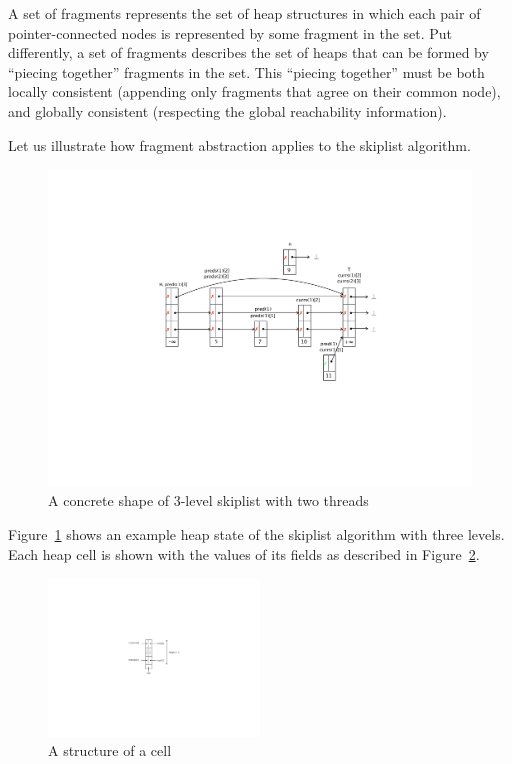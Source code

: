 A set of fragments represents the set of heap
structures in which each pair of pointer-connected nodes is represented by some
fragment in the set.
Put differently, a set of fragments describes the set of heaps that can be formed by
``piecing together'' fragments in the set.
This ``piecing together'' must
be both locally consistent (appending only fragments that agree on their
common node), and globally consistent (respecting the global reachability
information).

Let us illustrate how fragment abstraction applies to the skiplist
algorithm.
\begin{figure}
\center  
 \includegraphics[width=1.2\textwidth, trim={7cm 8cm 0.5cm 6cm}, clip]{skipshape.pdf}  
 \caption{A concrete shape of 3-level skiplist with two threads}
\label{sl-shape}
\end{figure}
Figure~\ref{sl-shape} shows an example heap state of the
skiplist algorithm with three levels. Each heap cell is shown with the values of its fields as described in Figure~\ref{skipcell}. %


\begin{figure} 
\vspace{-50pt}
  \begin{center}
 \includegraphics[width=0.5\textwidth, trim={13cm 10cm 12.5cm 9cm}, clip]{skipcell.pdf}  
    \caption{A structure of a cell}
    \label{skipcell}
  \end{center}
  \vspace{-40pt}
  \vspace{1pt}
\end{figure}


